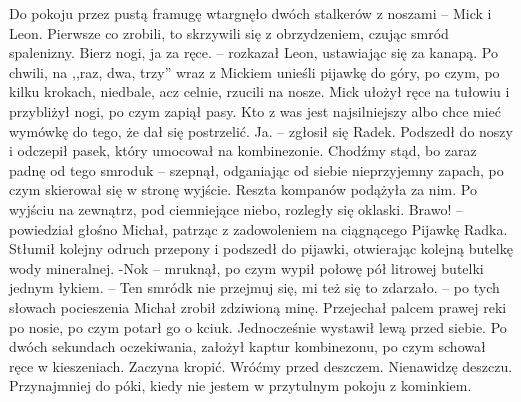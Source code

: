 \documentclass[../MAIN.tex]{subfiles}
\begin{document}
\qd
Do pokoju przez pustą framugę wtargnęło dwóch stalkerów z noszami -- Mick i Leon. Pierwsze co zrobili, to skrzywili się z obrzydzeniem, czując smród spalenizny.
\sx Bierz nogi, ja za ręce. -- rozkazał Leon, ustawiając się za kanapą. Po chwili, na ,,raz, dwa, trzy'' wraz z Mickiem unieśli pijawkę do góry, po czym, po kilku krokach, niedbale, acz celnie, rzucili na nosze. Mick ułożył ręce na tułowiu i przybliżył nogi, po czym zapiął pasy.
\xx Kto z was jest najsilniejszy albo chce mieć wymówkę do tego, że dał się postrzelić.
\xx Ja. -- zgłosił się Radek. Podszedł do noszy i odczepił pasek, który umocował na kombinezonie.
\xx Chodźmy stąd, bo zaraz padnę od tego smrodu\3k -- szepnął, odganiając od siebie nieprzyjemny zapach, po czym skierował się w stronę wyjście. 
\qd
Reszta kompanów podążyła za nim. Po wyjściu na zewnątrz, pod ciemniejące niebo, rozległy się oklaski.
\sx Brawo! -- powiedział głośno Michał, patrząc z zadowoleniem na ciągnącego Pijawkę Radka. 
\qd
Stłumił kolejny odruch przepony i podszedł do pijawki, otwierając kolejną butelkę wody mineralnej.
-No\3k -- mruknął, po czym wypił połowę pół litrowej butelki jednym łykiem. -- Ten smród\3k nie przejmuj się, mi też się to zdarzało. -- po tych słowach pocieszenia Michał zrobił zdziwioną minę. Przejechał palcem prawej reki po nosie, po czym potarł go o kciuk. Jednocześnie wystawił lewą przed siebie. Po dwóch sekundach oczekiwania, założył kaptur kombinezonu, po czym schował ręce w kieszeniach.
\sx Zaczyna kropić. Wróćmy przed deszczem. Nienawidzę deszczu. Przynajmniej do póki, kiedy nie jestem w przytulnym pokoju z kominkiem.
\qd
\end{document}
